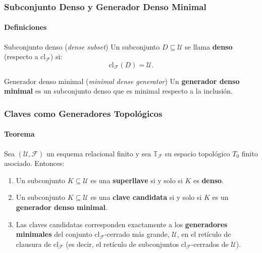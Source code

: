 \documentclass[aspectratio=169,12pt]{beamer}
\begin{document}
\begin{frame}
    \frametitle{Subconjunto Denso y Generador Denso Minimal}
    \framesubtitle{Definiciones}

    \small

    \begin{block}{Subconjunto denso (\textit{dense subset})}
        Un subconjunto $D \subseteq \mathcal{U}$ se llama \textbf{denso} (respecto a $\mathrm{cl}_{\mathcal{F}}$) si:
        \[ \mathrm{cl}_{\mathcal{F}}(D) = \mathcal{U}. \]
    \end{block}

    \begin{block}{Generador denso minimal (\textit{minimal dense generator})}
        Un \textbf{generador denso minimal} es un subconjunto denso que es minimal respecto a la inclusión.
    \end{block}
\end{frame}

\begin{frame}
    \frametitle{Claves como Generadores Topológicos}
    \framesubtitle{Teorema}

    \small

    Sea $(\mathcal{U}, \mathcal{F})$ un esquema relacional finito y sea $\mathbb{T}_{\mathcal{F}}$ su espacio topológico $T_0$ finito asociado. Entonces:

    \vspace{0.3cm}

    \begin{enumerate}
        \item[(i)] Un subconjunto $K \subseteq \mathcal{U}$ es una \textbf{superllave} si y solo si $K$ es \textbf{denso}.

        \vspace{0.2cm}

        \item[(ii)] Un subconjunto $K \subseteq \mathcal{U}$ es una \textbf{clave candidata} si y solo si $K$ es un \textbf{generador denso minimal}.

        \vspace{0.2cm}

        \item[(iii)] Las claves candidatas corresponden exactamente a los \textbf{generadores minimales} del conjunto $\mathrm{cl}_{\mathcal{F}}$-cerrado más grande, $\mathcal{U}$, en el retículo de clausura de $\mathrm{cl}_{\mathcal{F}}$ (es decir, el retículo de subconjuntos $\mathrm{cl}_{\mathcal{F}}$-cerrados de $\mathcal{U}$).
    \end{enumerate}
\end{frame}
\end{document}
